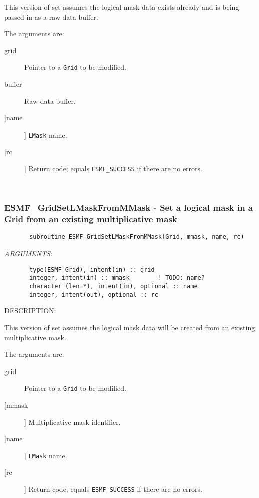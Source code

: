        This version of set assumes the logical mask data exists already and is
       being passed in as a raw data buffer.
  
       The arguments are:
       \begin{description}
       \item[grid]
            Pointer to a {\tt Grid} to be modified.
       \item[buffer]
            Raw data buffer.
       \item [[name]]
             {\tt LMask} name.
       \item[[rc]]
            Return code; equals {\tt ESMF\_SUCCESS} if there are no errors.
       \end{description}
   
 
\mbox{}\hrulefill\ 
 
\subsubsection{ESMF\_GridSetLMaskFromMMask - Set a logical mask in a Grid from an existing multiplicative mask}


 
\begin{verbatim}       subroutine ESMF_GridSetLMaskFromMMask(Grid, mmask, name, rc)\end{verbatim}{\em ARGUMENTS:}
\begin{verbatim}       type(ESMF_Grid), intent(in) :: grid
       integer, intent(in) :: mmask        ! TODO: name?
       character (len=*), intent(in), optional :: name
       integer, intent(out), optional :: rc\end{verbatim}
{\sf DESCRIPTION:\\ }


       This version of set assumes the logical mask data will be
       created from an existing multiplicative mask.
  
       The arguments are:
       \begin{description}
       \item[grid]
            Pointer to a {\tt Grid} to be modified.
       \item[[mmask]]
            Multiplicative mask identifier.
       \item [[name]]
             {\tt LMask} name.
       \item[[rc]]
            Return code; equals {\tt ESMF\_SUCCESS} if there are no errors.
       \end{description}
   
